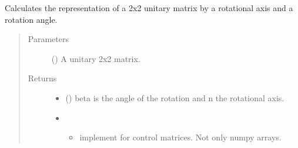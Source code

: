 \documentclass[letterpaper,10pt,english]{sphinxmanual}
\begin{document}
\begin{fulllineitems}
\label{\detokenize{qsim:qsim.cost_functions.angle_axis_representation}}
Calculates the representation of a 2x2 unitary matrix by a rotational axis
and a rotation angle.
\begin{quote}\begin{description}
\item[{Parameters}] \leavevmode
{} () \textendash{} A unitary 2x2 matrix.

\item[{Returns}] \leavevmode
\begin{itemize}
\item {} 
 () \textendash{} beta is the angle of the rotation and n the rotational axis.

\item {} 
 \textendash{}
\begin{itemize}
\item {} 
implement for control matrices. Not only numpy arrays.

\end{itemize}

\end{itemize}


\end{description}\end{quote}

\end{fulllineitems}

\end{document}
